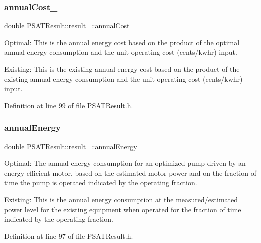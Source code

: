\subsubsection{\texorpdfstring{annual\+Cost\+\_\+}{annualCost\_}}
{\footnotesize\ttfamily double P\+S\+A\+T\+Result\+::result\+\_\+\+::annual\+Cost\+\_\+}



Optimal\+: This is the annual energy cost based on the product of the optimal annual energy consumption and the unit operating cost (cents/kwhr) input. 

Existing\+: This is the existing annual energy cost based on the product of the existing annual energy consumption and the unit operating cost (cents/kwhr) input. 

Definition at line 99 of file P\+S\+A\+T\+Result.\+h.

\mbox{\label{struct_p_s_a_t_result_1_1result___acf5bcf6c5226d5e322239be520280ffc}} 
\subsubsection{\texorpdfstring{annual\+Energy\+\_\+}{annualEnergy\_}}
{\footnotesize\ttfamily double P\+S\+A\+T\+Result\+::result\+\_\+\+::annual\+Energy\+\_\+}



Optimal\+: The annual energy consumption for an optimized pump driven by an energy-\/efficient motor, based on the estimated motor power and on the fraction of time the pump is operated indicated by the operating fraction. 

Existing\+: This is the annual energy consumption at the measured/estimated power level for the existing equipment when operated for the fraction of time indicated by the operating fraction. 

Definition at line 97 of file P\+S\+A\+T\+Result.\+h.

\mbox{\label{struct_p_s_a_t_result_1_1result___acfdf51d60ae1007a94dcd46df3185c15}} 
